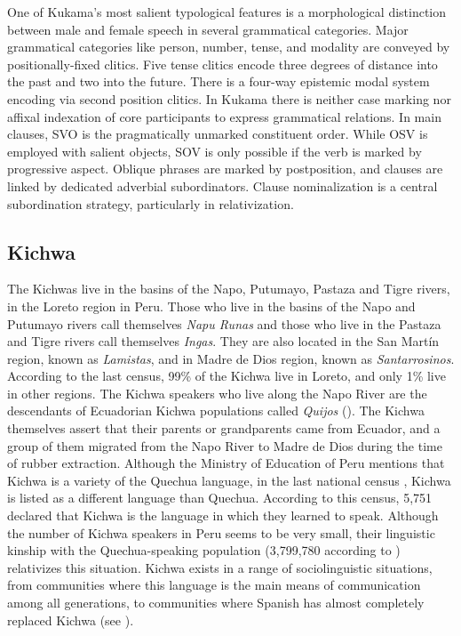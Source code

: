 \documentclass[output=paper]{langscibook}
\begin{document}
One of Kukama’s most salient typological features is a morphological distinction between male and female speech in several grammatical categories. Major grammatical categories like person, number, tense, and modality are conveyed by positionally-fixed clitics. Five tense clitics encode three degrees of distance into the past and two into the future. There is a four-way epistemic modal system encoding via second position clitics. In Kukama there is neither case marking nor affixal indexation of core participants to express grammatical relations. In main clauses, SVO is the pragmatically unmarked constituent order. While OSV is employed with salient objects, SOV is only possible if the verb is marked by progressive aspect. Oblique phrases are marked by postposition, and clauses are linked by dedicated adverbial subordinators. Clause nominalization is a central subordination strategy, particularly in relativization.

\subsection{Kichwa}\label{sec:7:2.2}

The Kichwas live in the basins of the Napo, Putumayo, Pastaza and Tigre rivers, in the Loreto region in Peru. Those who live in the basins of the Napo and Putumayo rivers call themselves \textit{Napu Runas} and those who live in the Pastaza and Tigre rivers call themselves \textit{Ingas}. They are also located in the San Martín region, known as \textit{Lamistas}, and in Madre de Dios region, known as \textit{Santarrosinos}. According to the last census, 99\% of the Kichwa live in Loreto, and only 1\% live in other regions. The Kichwa speakers who live along the Napo River are the descendants of Ecuadorian Kichwa populations called \textit{Quijos} (\citealt{MayorBodmer2009}). The Kichwa themselves assert that their parents or grandparents came from Ecuador, and a group of them migrated from the Napo River to Madre de Dios during the time of rubber extraction. Although the Ministry of Education of Peru mentions that Kichwa is a variety of the Quechua language, in the last national census \citep{INEI2017}, Kichwa is listed as a different language than Quechua. According to this census, 5,751 declared that Kichwa is the language in which they learned to speak. Although the number of Kichwa speakers in Peru seems to be very small, their linguistic kinship with the Quechua-speaking population (3,799,780 according to \citealt{INEI2017}) relativizes this situation. Kichwa exists in a range of sociolinguistic situations, from communities where this language is the main means of communication among all generations, to communities where Spanish has almost completely replaced Kichwa (see ).
\end{document}
